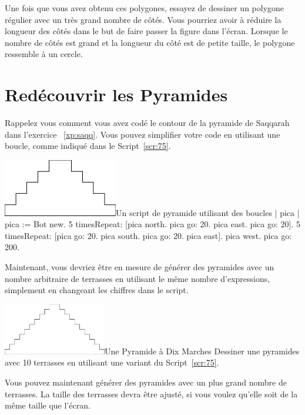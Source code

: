 \documentclass[a4paper,10pt,twoside]{book}
\begin{document}
Une fois que vous avez obtenu ces polygones, essayez de dessiner un polygone régulier avec 
un très grand nombre de côtés. Vous pourriez avoir à réduire la longueur des côtés dans le 
but de faire passer la figure dans l'écran. Lorsque le nombre de côtés est grand et la 
longueur du côté est de petite taille, le polygone ressemble à un cercle.


\section{Redécouvrir les Pyramides} 

Rappelez vous comment vous avez codé le contour de la pyramide de Saqqarah dans l'exercice
~\ref{xp:saqq}. Vous pouvez simplifier votre code en utilisant une boucle, comme indiqué 
dans le Script~\ref{scr:75}. 


\begin{scriptfigwithsize}[0.4]{\includegraphics[width=5cm]{loopPyramid}}{Un script de pyramide utilisant des boucles}\label{scr:75}
| pica | 
pica := Bot new. 
5 timesRepeat: 
	[pica north. 
	pica go: 20. 
	pica east. 
	pica go: 20]. 
5 timesRepeat: 
	[pica go: 20. 
	pica south. 
	pica go: 20. 
	pica east]. 
pica west. 
pica go: 200. 
\end{scriptfigwithsize}

Maintenant, vous devriez être en mesure de générer des pyramides avec un nombre arbitraire 
de terrasses en utilisant le même nombre d'expressions, simplement en changeant les 
chiffres dans le script. 


\begin{exofigwithsizeandtitle}[0.55]{\includegraphics[width=4.5cm]{loopPyramid10}}{Une Pyramide à Dix Marches}
Dessiner une pyramides avec 10 terrasses en utilisant une variant du Script~\ref{scr:75}. 
\end{exofigwithsizeandtitle}

Vous pouvez maintenant générer des pyramides avec un plus grand nombre de terrasses. La taille des terrasses 
devra être ajusté, si vous voulez qu’elle soit de la même taille que l'écran. 
\end{document}
